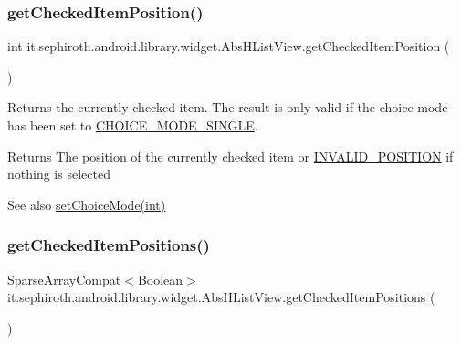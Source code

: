 \subsubsection{\texorpdfstring{get\+Checked\+Item\+Position()}{getCheckedItemPosition()}}
{\footnotesize\ttfamily int it.\+sephiroth.\+android.\+library.\+widget.\+Abs\+H\+List\+View.\+get\+Checked\+Item\+Position (\begin{DoxyParamCaption}{ }\end{DoxyParamCaption})}

Returns the currently checked item. The result is only valid if the choice mode has been set to \hyperlink{}{C\+H\+O\+I\+C\+E\+\_\+\+M\+O\+D\+E\+\_\+\+S\+I\+N\+G\+LE}.

\begin{DoxyReturn}{Returns}
The position of the currently checked item or \hyperlink{classit_1_1sephiroth_1_1android_1_1library_1_1widget_1_1_adapter_view_a2751b7d592638baeaf149f6da0d4e598}{I\+N\+V\+A\+L\+I\+D\+\_\+\+P\+O\+S\+I\+T\+I\+ON} if nothing is selected
\end{DoxyReturn}
\begin{DoxySeeAlso}{See also}
\hyperlink{classit_1_1sephiroth_1_1android_1_1library_1_1widget_1_1_abs_h_list_view_aac2532ddba38bddaecf4a009a9aa96fb}{set\+Choice\+Mode(int)} 
\end{DoxySeeAlso}
\mbox{\label{classit_1_1sephiroth_1_1android_1_1library_1_1widget_1_1_abs_h_list_view_ab624d6eb210c1c99a9a8646dbeb0c944}} 
\subsubsection{\texorpdfstring{get\+Checked\+Item\+Positions()}{getCheckedItemPositions()}}
{\footnotesize\ttfamily Sparse\+Array\+Compat$<$Boolean$>$ it.\+sephiroth.\+android.\+library.\+widget.\+Abs\+H\+List\+View.\+get\+Checked\+Item\+Positions (\begin{DoxyParamCaption}{ }\end{DoxyParamCaption})}

